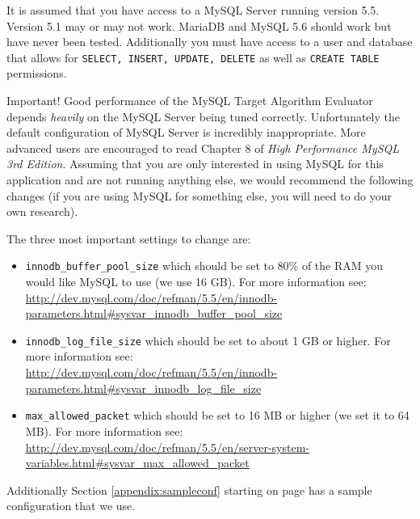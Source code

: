 \documentclass[11pt,letterpaper,oneside]{article}
\begin{document}
It is assumed that you have access to a MySQL Server running version 5.5. Version 5.1 may or may not work. MariaDB and MySQL 5.6 should work but have never been tested. Additionally you must have access to a user and database that allows for \texttt{SELECT, INSERT, UPDATE, DELETE} as well as \texttt{CREATE TABLE} permissions.

\begin{bclogo}[logo=\bcattention, couleurBarre=red, noborder=true]{Important!}
Good performance of the MySQL Target Algorithm Evaluator depends \emph{heavily} on the MySQL Server being tuned correctly. Unfortunately the default configuration of MySQL Server is incredibly inappropriate. More advanced users are encouraged to read Chapter 8 of \emph{High Performance MySQL 3rd Edition}.  Assuming that you are only interested in using MySQL for this application and are not running anything else, we would recommend the following changes (if you are using MySQL for something else, you will need to do your own research).

The three most important settings to change are:

\begin{itemize}
\item \texttt{innodb\_buffer\_pool\_size} which should be set to 80\% of the RAM you would like MySQL to use (we use 16 GB). For more information see: \\ \url{http://dev.mysql.com/doc/refman/5.5/en/innodb-parameters.html\#sysvar\_innodb\_buffer\_pool\_size}

\item \texttt{innodb\_log\_file\_size} which should be set to about 1 GB or higher.  For more information see: \\
\url{http://dev.mysql.com/doc/refman/5.5/en/innodb-parameters.html\#sysvar\_innodb\_log\_file\_size}

\item \texttt{max\_allowed\_packet} which should be set to 16 MB or higher (we set it to 64 MB). For more information see: \\
\url{http://dev.mysql.com/doc/refman/5.5/en/server-system-variables.html\#sysvar\_max\_allowed\_packet}

\end{itemize}

Additionally Section \ref{appendix:sampleconf} starting on page \pageref{appendix:sampleconf} has a sample configuration that we use.

\end{bclogo}
\end{document}
